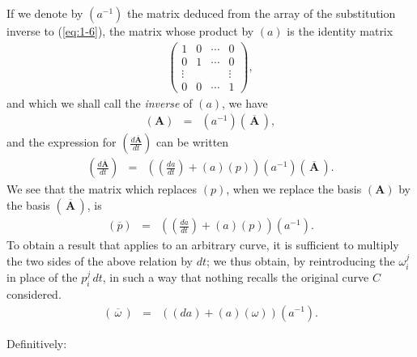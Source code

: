 If we denote by $\left(a^{-1} \right)$ the matrix deduced from the array of the substitution inverse to (\ref{eq:1-6}), the matrix whose product by $(a)$ is the identity matrix
\begin{eqnarray*}
\left(
\begin{array}{cccc}
1 &  0   & \cdots & 0 \\
0 &  1    & \cdots & 0 \\
\vdots &    &  & \vdots \\
0 &  0    & \cdots & 1 
\end{array}
\right),
\end{eqnarray*}
and which we shall call the {\em inverse} of $(a)$, we have
\begin{eqnarray*}
(\bm A) &=& (a^{-1}) (\, \overline{\bm A}\, ) ,
\end{eqnarray*}
and the expression for $\left( \frac{d\overline{\bm A}}{dt} \right)$ can be written
\begin{eqnarray*}
\left( \frac{d\overline{\bm A}}{dt} \right) &=& 
\left( \left(\frac{da}{dt} \right)  + (a) (p) \right) (a^{-1}) \left(\, \overline{\bm A}\, \right) .
\end{eqnarray*}
We see that the matrix which replaces $(p)$, when we replace the basis $(\bm A)$ by the basis $(\, \overline{\bm A} \, )$, is
\begin{eqnarray*}
\left( \overline{p} \right) &=& 
\left( \left(\frac{da}{dt} \right)  + (a) (p) \right) (a^{-1})  .
\end{eqnarray*}
To obtain a result that applies to an arbitrary curve, it is sufficient to multiply the two sides of the above relation by $dt$; we thus obtain, by reintroducing the $\omega^j_i$ in place of the $p^j_i\, dt$, in such a way that nothing recalls the original curve $C$ considered.
\begin{eqnarray}
(\, \overline \omega \,) &=& \left( (da) +(a) (\omega) \right) (a^{-1}) .
\label{eq:1-7}
\end{eqnarray}

Definitively:

